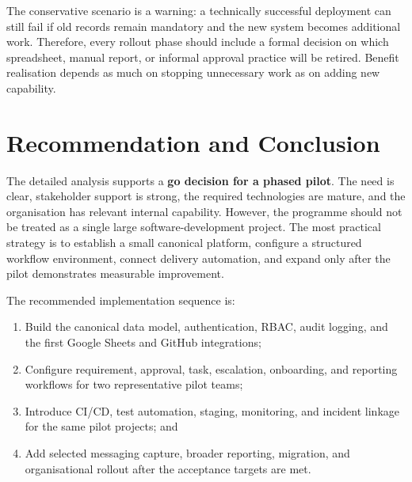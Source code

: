 \documentclass[12pt,a4paper]{report}
\begin{document}
The conservative scenario is a warning: a technically successful deployment can still fail if old
records remain mandatory and the new system becomes additional work. Therefore, every rollout
phase should include a formal decision on which spreadsheet, manual report, or informal approval
practice will be retired. Benefit realisation depends as much on stopping unnecessary work as on
adding new capability.


\section{Recommendation and Conclusion}
\label{sec:analysis-recommendation}

The detailed analysis supports a \textbf{go decision for a phased pilot}. The need is clear,
stakeholder support is strong, the required technologies are mature, and the organisation has
relevant internal capability. However, the programme should not be treated as a single large
software-development project. The most practical strategy is to establish a small canonical
platform, configure a structured workflow environment, connect delivery automation, and expand
only after the pilot demonstrates measurable improvement.

The recommended implementation sequence is:

\begin{enumerate}[label=\textbf{Phase \arabic*:}, leftmargin=2.2cm]
    \item Build the canonical data model, authentication, RBAC, audit logging, and the first
          Google Sheets and GitHub integrations;
    \item Configure requirement, approval, task, escalation, onboarding, and reporting workflows
          for two representative pilot teams;
    \item Introduce CI/CD, test automation, staging, monitoring, and incident linkage for the same
          pilot projects; and
    \item Add selected messaging capture, broader reporting, migration, and organisational rollout
          after the acceptance targets are met.
\end{enumerate}
\end{document}
